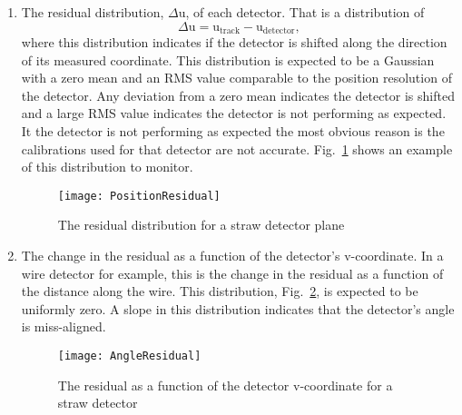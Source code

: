 \begin{enumerate}[label=\roman*)]
\item The residual distribution, $\Delta$u, of each detector.  That is a
  distribution of
  \begin{equation}
    \Delta \mathrm{u} =
    \mathrm{u}_{\mathrm{track}} - \mathrm{u}_{\mathrm{detector}},
  \end{equation}
  where this distribution indicates if the detector is shifted along the
  direction of its measured coordinate.  This distribution is expected to be a
  Gaussian with a zero mean and an RMS value comparable to the position
  resolution of the detector.  Any deviation from a zero mean indicates the
  detector is shifted and a large RMS value indicates the detector is not
  performing as expected.  It the detector is not performing as expected the
  most obvious reason is the calibrations used for that detector are not
  accurate.  Fig.~\ref{fig::PositionResidual} shows an example of this
  distribution to monitor.
  \begin{figure}[h!t]
  \centering \texttt{[image: PositionResidual]}
  \caption{The residual distribution for a straw detector plane}
  \label{fig::PositionResidual}
  
\end{figure}
\item The change in the residual as a function of the detector's v-coordinate.
  In a wire detector for example, this is the change in the residual as a
  function of the distance along the wire.  This distribution,
  Fig.~\ref{fig::AngleResidual}, is expected to be uniformly zero.  A slope in
  this distribution indicates that the detector's angle is miss-aligned.
  \begin{figure}[h!t]
    \centering \texttt{[image: AngleResidual]}
    \caption{The residual as a function of the detector v-coordinate for a straw
      detector}
    \label{fig::AngleResidual}
  \end{figure}
  

\end{enumerate}
